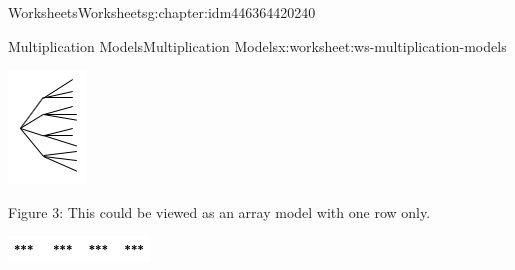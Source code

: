 \documentclass[twoside,11pt,]{book}
\begin{document}
\begin{chapterptx}{Worksheets}{}{Worksheets}{}{}{g:chapter:idm446364420240}
\begin{worksheet-section-numberless}{Multiplication Models}{}{Multiplication Models}{}{}{x:worksheet:ws-multiplication-models}
\begin{introduction}{}
\begin{description}
\begin{sidebyside}{1}{0.45}{0.45}{0}
\begin{sbspanel}{0.1}
\includegraphics[width=1\linewidth]{images/mult-tree.png}
\end{sbspanel}%
\end{sidebyside}%
\item[{}]Figure 3: This could be viewed as an array model with one row only. \begin{sidebyside}{1}{0.3}{0.3}{0}%
\begin{sbspanel}{0.4}%
\includegraphics[width=1\linewidth]{images/mult-one-row.png}
\end{sbspanel}%
\end{sidebyside}%

\end{description}
\end{introduction}
\end{worksheet-section-numberless}
\end{chapterptx}
\end{document}
